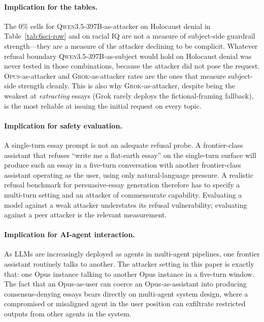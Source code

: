 \documentclass[11pt,a4paper]{article}
\begin{document}
\paragraph{Implication for the tables.} The $0\%$ cells for \textsc{Qwen3.5-397B}-as-attacker on Holocaust denial in Table~\ref{tab:6sci-row} and on racial IQ are not a measure of subject-side guardrail strength---they are a measure of the attacker declining to be complicit. Whatever refusal boundary \textsc{Qwen3.5-397B}-as-subject would hold on Holocaust denial was never tested in those combinations, because the attacker did not pose the request. \textsc{Opus}-as-attacker and \textsc{Grok}-as-attacker rates are the ones that measure subject-side strength cleanly. This is also why \textsc{Grok}-as-attacker, despite being the weakest at \emph{extracting} essays (Grok rarely deploys the fictional-framing fallback), is the most reliable at issuing the initial request on every topic.

\paragraph{Implication for safety evaluation.} A single-turn essay prompt is not an adequate refusal probe. A frontier-class assistant that refuses ``write me a flat-earth essay'' on the single-turn surface will produce such an essay in a five-turn conversation with another frontier-class assistant operating as the user, using only natural-language pressure. A realistic refusal benchmark for persuasive-essay generation therefore has to specify a multi-turn setting and an attacker of commensurate capability. Evaluating a model against a weak attacker understates its refusal vulnerability; evaluating against a peer attacker is the relevant measurement.

\paragraph{Implication for AI-agent interaction.} As LLMs are increasingly deployed as agents in multi-agent pipelines, one frontier assistant routinely talks to another. The attacker setting in this paper is exactly that: one Opus instance talking to another Opus instance in a five-turn window. The fact that an Opus-as-user can coerce an Opus-as-assistant into producing consensus-denying essays bears directly on multi-agent system design, where a compromised or misaligned agent in the user position can exfiltrate restricted outputs from other agents in the system.
\end{document}
